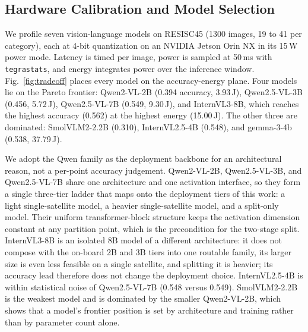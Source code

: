 
\subsection{Hardware Calibration and Model Selection}\label{EV_CALIB}
We profile seven vision-language models on RESISC45 (1300 images, 19 to 41 per
category), each at 4-bit quantization on an NVIDIA Jetson Orin NX in its 15\,W
power mode. Latency is timed per image, power is sampled at 50\,ms with
\texttt{tegrastats}, and energy integrates power over the inference window.
Fig.~\ref{fig:tradeoff} places every model on the accuracy-energy plane. Four
models lie on the Pareto frontier: Qwen2-VL-2B (0.394 accuracy, 3.93\,J),
Qwen2.5-VL-3B (0.456, 5.72\,J), Qwen2.5-VL-7B (0.549, 9.30\,J), and InternVL3-8B,
which reaches the highest accuracy (0.562) at the highest energy (15.00\,J). The
other three are dominated: SmolVLM2-2.2B (0.310), InternVL2.5-4B (0.548), and
gemma-3-4b (0.538, 37.79\,J).

We adopt the Qwen family as the deployment backbone for an architectural reason,
not a per-point accuracy judgement. Qwen2-VL-2B, Qwen2.5-VL-3B, and
Qwen2.5-VL-7B share one architecture and one activation interface, so they form a
single three-tier ladder that maps onto the deployment tiers of this work: a
light single-satellite model, a heavier single-satellite model, and a split-only
model. Their uniform transformer-block structure keeps the activation dimension
constant at any partition point, which is the precondition for the two-stage
split. InternVL3-8B is an isolated 8B model of a different architecture: it does
not compose with the on-board 2B and 3B tiers into one routable family, its
larger size is even less feasible on a single satellite, and splitting it is
heavier; its accuracy lead therefore does not change the deployment choice.
InternVL2.5-4B is within statistical noise of Qwen2.5-VL-7B (0.548 versus 0.549).
SmolVLM2-2.2B is the weakest model and is dominated by the smaller Qwen2-VL-2B,
which shows that a model's frontier position is set by architecture and training
rather than by parameter count alone.

